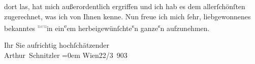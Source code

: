                dort las, hat mich außerordentlich ergriffen und ich hab es dem allerſchönſten
               zugerechnet, was ich von Ihnen {\pb}kenne. Nun freue ich mich{ }ſehr, liebgewonnenes bekanntes \substVorne{}\textsuperscript{\textcolor{gray}{neu}}\substDazwischen{}in\substHinten{} ein\substVorne{}\textsuperscript{e}\substDazwischen{}em\substHinten{} herbeigewünſchte\substVorne{}\textsuperscript{s}\substDazwischen{}n\substHinten{} ganze\substVorne{}\textsuperscript{s}\substDazwischen{}n\substHinten{} aufzunehmen.\pend
           
\pstart
           Ihr Sie aufrichtig hochſchätzender{\\[\baselineskip]}\spacefill\mbox{Arthur Schnitzler}\pend
           \leftskip=0em{}
\pstart
           Wien22/3 903\pend
           \endnumbering{}  \newcommand{\dateiname}{L01278}\newcommand{\titel}{Arthur Schnitzler an Richard Dehmel, 22. 3. 1903}\newcommand{\editorInnen}{Martin Anton Müller und Gerd-Hermann Susen}
